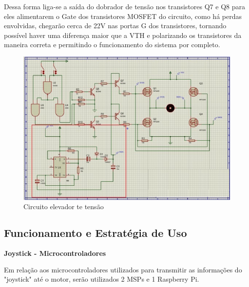 Dessa forma liga-se a saída do dobrador de tensão nos transistores Q7 e Q8 para eles alimentarem o Gate dos transistores MOSFET do circuito, como há perdas envolvidas, chegarão cerca de 22V nas portas G dos transistores, tornando possível haver uma diferença maior que a VTH e polarizando os transistores da maneira correta e permitindo o funcionamento do sistema por completo.

\begin{figure}[!htb]
	\centering
	\includegraphics[keepaspectratio=true,scale=0.8]{figuras/referencialteorico/figurax_4.eps}
	\caption{Circuito elevador te tensão}
	\label{fig:figx+4}
\end{figure}

\subsection{Funcionamento e Estratégia de Uso}

\textbf{Joystick - Microcontroladores}

Em relação aos microcontroladores utilizados para transmitir as informações do "joystick" até o motor, serão utilizados 2 MSPs e 1 Raspberry Pi.


